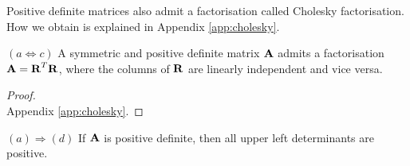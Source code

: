 \documentclass[a4paper]{article}
\numberwithin{equation}{section} %
\newcommand{\B}[1]{\textbf{\textup{#1}}} %
\begin{document}
Positive definite matrices also admit a factorisation called Cholesky factorisation. How we obtain is explained in Appendix \ref{app:cholesky}.

\begin{lemma}
$(a \Leftrightarrow c)$ A symmetric and positive definite matrix $\B{A}$ admits a factorisation $\B{A}=\B{R}^{T}\B{R}$, where the columns of $\B{R}$ are linearly independent and vice versa.
\end{lemma}

\begin{proof}
\quad \\
Appendix \ref{app:cholesky}.
\end{proof}

\begin{lemma}
$(a)\Rightarrow (d)$ If $\B{A}$ is positive definite, then all upper left determinants are positive.
\end{lemma}
\end{document}
